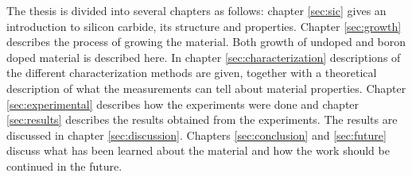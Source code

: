 The thesis is divided into several chapters as follows: chapter \ref{sec:sic} gives an introduction to silicon carbide, its structure and properties. Chapter \ref{sec:growth} describes the process of growing the material. Both growth of undoped and boron doped material is described here. In chapter \ref{sec:characterization} descriptions of the different characterization methods are given, together with a theoretical description of what the measurements can tell about material properties. Chapter \ref{sec:experimental} describes how the experiments were done and chapter \ref{sec:results} describes the results obtained from the experiments. The results are discussed in chapter \ref{sec:discussion}. Chapters \ref{sec:conclusion} and \ref{sec:future} discuss what has been learned about the material and how the work should be continued in the future. 



































